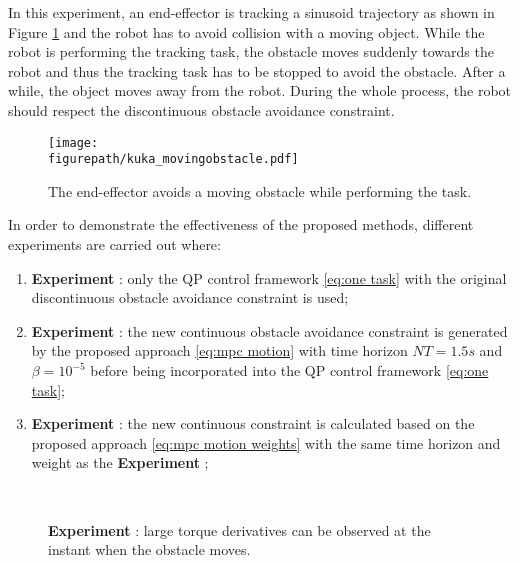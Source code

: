 In this experiment, an end-effector is tracking a sinusoid trajectory as shown in Figure \ref{fig:scenario for obstacle} and the robot has to avoid collision with a moving object. While the robot is performing the tracking task, the obstacle moves suddenly towards the robot and thus the tracking task has to be stopped to avoid the obstacle. After a while, the object moves away from the robot. During the whole process, the robot should respect the discontinuous obstacle avoidance constraint.



\begin{figure}[!h]
\centering
\texttt{[image: \\figurepath/kuka\_movingobstacle.pdf]}
\caption{The end-effector avoids a moving obstacle while performing the task.}
\label{fig:scenario for obstacle}
\end{figure}

In order to demonstrate the effectiveness of the proposed methods, different experiments are carried out where:
\begin{enumerate}[]
\item \textbf{Experiment} : only the QP control framework \eqref{eq:one task} with the original discontinuous obstacle avoidance constraint is used;
\item \textbf{Experiment} : the new continuous obstacle avoidance constraint is generated by the proposed approach \eqref{eq:mpc motion} with time horizon $NT=1.5s$ and $\beta=10^{-5}$ before being incorporated into the QP control framework \eqref{eq:one task};
\item \textbf{Experiment} : the new continuous constraint is calculated based on the proposed approach \eqref{eq:mpc motion weights} with the same time horizon and weight as the \textbf{Experiment} ;
\end{enumerate}


\begin{figure}[!htb]
\centering
{} \\
 \quad
{}\quad
\caption{\textbf{Experiment} : large torque derivatives can be observed at the instant when the obstacle moves.}
\label{fig:kuka obstacle dis}
\end{figure}



